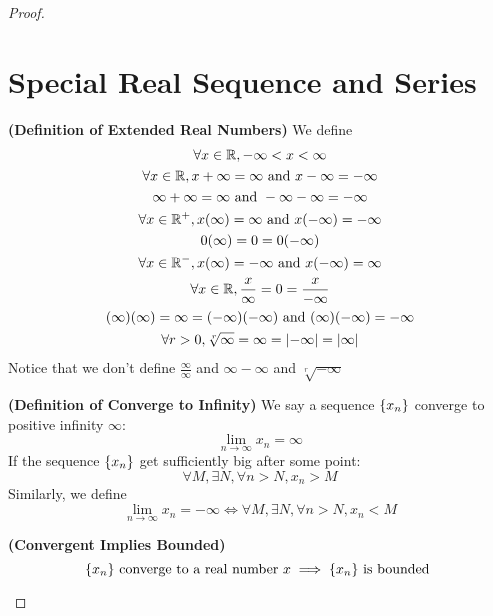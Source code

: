 \documentclass{report}
\begin{document}
\begin{proof}
\section{Special Real Sequence and Series}
\begin{definition}
\label{2.1.1}
\textbf{(Definition of Extended Real Numbers)} We define
\begin{gather}
\forall x\in\mathbb{R}, -\infty <x<\infty\\
\forall x\in\mathbb{R}, x+\infty=\infty \text{ and }x-\infty=-\infty\\
\infty+\infty=\infty \text{ and }-\infty-\infty=-\infty\\
\forall x\in\mathbb{R}^+, x(\infty)=\infty \text{ and }x(-\infty)=-\infty\\
0(\infty)=0=0(-\infty)\\
\forall x\in\mathbb{R}^-, x(\infty)=-\infty\text{ and }x(-\infty)=\infty\\
\forall x\in\mathbb{R}, \frac{x}{\infty}=0=\frac{x}{-\infty}\\
  (\infty)(\infty)=\infty=(-\infty)(-\infty)\text{ and }(\infty)(-\infty)=-\infty\\
  \forall r>0, \sqrt[r]{\infty}=\infty=\left|-\infty\right|= \left|\infty\right|
\end{gather}
Notice that we don't define  $\frac{\infty}{\infty}$ and $\infty-\infty$ and $\sqrt[r]{-\infty} $
\end{definition}
\begin{definition}
\label{2.1.2}
\textbf{(Definition of Converge to Infinity)} We say a sequence $\{ x_n \}$ converge to positive infinity $\infty$:
\begin{equation}
\lim_{n\to\infty} x_n=\infty
\end{equation}
If the sequence $\{ x_n \}$ get sufficiently big after some point:
 \begin{equation}
\forall M, \exists N, \forall n>N, x_n>M
\end{equation}
Similarly, we define
\begin{equation}
\lim_{n\to\infty}x_n=-\infty\iff \forall M, \exists N, \forall n>N, x_n<M
\end{equation}
\end{definition}
\begin{theorem}
\label{2.1.3}
\textbf{(Convergent Implies Bounded)} 
\begin{equation}
\{ x_n \}\text{ converge to a real number $x$}\implies \{ x_n \}\text{ is bounded }
\end{equation}
\end{theorem}

\end{proof}
\end{document}
